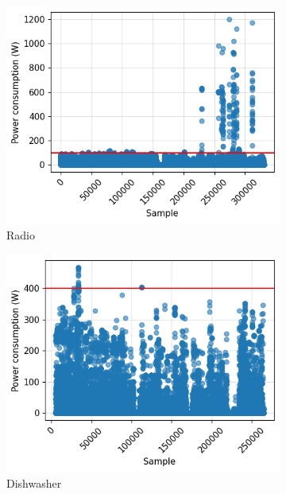 \begin{figure}
  \begin{subfigure}{.5\textwidth}
    \centering
    \includegraphics[width=.9\linewidth]{images/raw_consumptions/audio_amplifier.png}
    \caption{Radio}%
    \label{fig:radio}
  \end{subfigure}%
  \begin{subfigure}{.5\textwidth}
    \centering
    \includegraphics[width=.9\linewidth]{images/raw_consumptions/dish_washer.png}
    \caption{Dishwasher}%
    \label{fig:dish_washer}
  \end{subfigure}
  \begin{subfigure}{.5\textwidth}
    \centering

\end{subfigure}
\end{figure}
